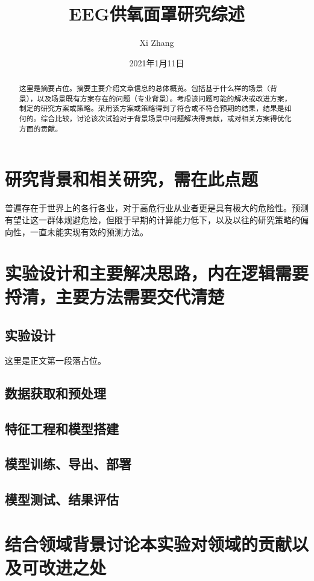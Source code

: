 \documentclass[UTF8]{ctexart}		%
\title{EEG供氧面罩研究综述}
\author{Xi Zhang}
\date{2021年1月11日}
\begin{document}
\maketitle							%


\begin{abstract}
	这里是摘要占位。摘要主要介绍文章信息的总体概览。包括基于什么样的场景（背景），以及场景既有方案存在的问题（专业背景）。考虑该问题可能的解决或改进方案，制定的研究方案或策略。采用该方案或策略得到了符合或不符合预期的结果，结果是如何的。综合比较，讨论该次试验对于背景场景中问题解决得贡献，或对相关方案得优化方面的贡献。
\end{abstract}

\section{研究背景和相关研究，需在此点题}
	普遍存在于世界上的各行各业，对于高危行业从业者更是具有极大的危险性。预测有望让这一群体规避危险，但限于早期的计算能力低下，以及以往的研究策略的偏向性，一直未能实现有效的预测方法。

\section{实验设计和主要解决思路，内在逻辑需要捋清，主要方法需要交代清楚}
\subsection{实验设计}
	这里是正文第一段落占位。

\subsection{数据获取和预处理}

\subsection{特征工程和模型搭建}

\subsection{模型训练、导出、部署}

\subsection{模型测试、结果评估}

\section{结合领域背景讨论本实验对领域的贡献以及可改进之处}
\end{document}
